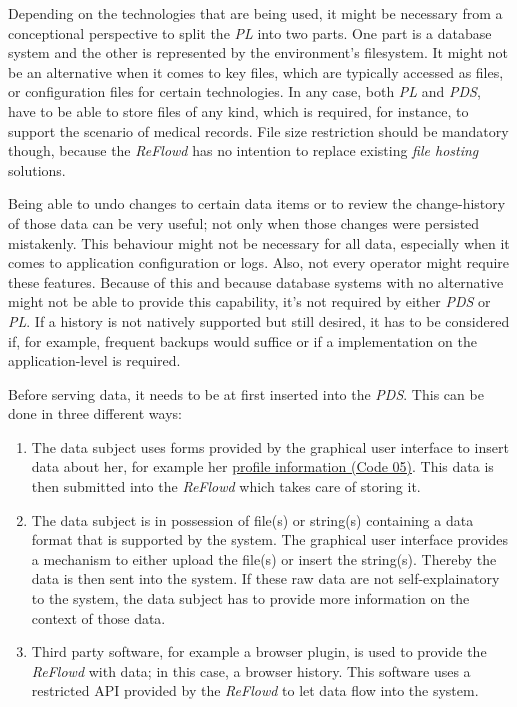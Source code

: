 \documentclass[12pt,english,a4paper,titlepage,cleardoublepage=empty,dottedtoc]{report}
\providecommand{\tightlist}{%
  \setlength{\itemsep}{0pt}\setlength{\parskip}{0pt}}
\begin{document}
Depending on the technologies that are being used, it might be necessary
from a conceptional perspective to split the \emph{PL} into two parts.
One part is a database system and the other is represented by the
environment's filesystem. It might not be an alternative when it comes
to key files, which are typically accessed as files, or configuration
files for certain technologies. In any case, both \emph{PL} and
\emph{PDS}, have to be able to store files of any kind, which is
required, for instance, to support the scenario of medical records. File
size restriction should be mandatory though, because the \emph{ReFlowd}
has no intention to replace existing \emph{file hosting} solutions.

Being able to undo changes to certain data items or to review the
change-history of those data can be very useful; not only when those
changes were persisted mistakenly. This behaviour might not be necessary
for all data, especially when it comes to application configuration or
logs. Also, not every operator might require these features. Because of
this and because database systems with no alternative might not be able
to provide this capability, it's not required by either \emph{PDS} or
\emph{PL}. If a history is not natively supported but still desired, it
has to be considered if, for example, frequent backups would suffice or
if a implementation on the application-level is required.

Before serving data, it needs to be at first inserted into the
\emph{PDS}. This can be done in three different ways:

\begin{enumerate}
\def\labelenumi{\alph{enumi})}
\tightlist
\item
  The data subject uses forms provided by the graphical user interface
  to insert data about her, for example her
  \protect\hyperlink{code-05_struct_profile}{profile information (Code
  05)}. This data is then submitted into the \emph{ReFlowd} which takes
  care of storing it.
\item
  The data subject is in possession of file(s) or string(s) containing a
  data format that is supported by the system. The graphical user
  interface provides a mechanism to either upload the file(s) or insert
  the string(s). Thereby the data is then sent into the system. If these
  raw data are not self-explainatory to the system, the data subject has
  to provide more information on the context of those data.
\item
  Third party software, for example a browser plugin, is used to provide
  the \emph{ReFlowd} with data; in this case, a browser history. This
  software uses a restricted API provided by the \emph{ReFlowd} to let
  data flow into the system.
\end{enumerate}
\end{document}
